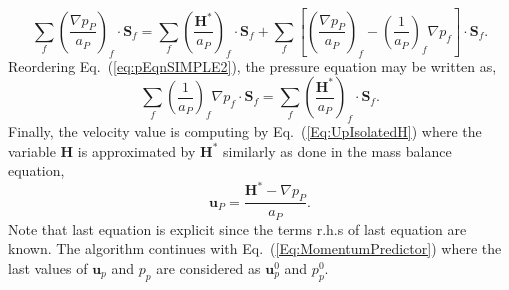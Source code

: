 \documentclass[final,3p,times,11pt,onecolumn]{myElsarticle}
\numberwithin{equation}{section}
\begin{document}
\begin{equation}
\label{eq:pEqnSIMPLE2}
\sum_{f} 
\left(
\dfrac
{
\nabla p_P}
{a_P}
\right)_f
\cdotp 
\textbf{S}_{f} 
=
\sum_f 
\left(
\dfrac{
\boldsymbol{H}^*
}
{
a_P
}
\right)_f
\cdot
\boldsymbol{S}_f 
+
\sum_f  
\left[
\left(
\frac{\nabla p_P}{a_P}
\right)_f
- 
\left(
\frac{1}{a_P}
\right)_f 
\nabla p_f
\right]
\cdot 
\boldsymbol{S}_f.
\end{equation}
Reordering Eq.~(\ref{eq:pEqnSIMPLE2}), the pressure equation may be written as,
\begin{equation}\label{eq:pEqnSIMPLE3}
\sum_f \left(\frac{1}{a_P}\right)_f \nabla p_f 
\cdot
\boldsymbol{S}_f 
=  \sum_f \left(\frac{\boldsymbol{H}^*}{a_P}\right)_f \cdot \boldsymbol{S}_f.
\end{equation}
Finally, the velocity value is computing by Eq.~(\ref{Eq:UpIsolatedH}) where the variable $\boldsymbol{H}$ is approximated by $\boldsymbol{H}^{*}$ similarly as done in the mass balance equation,
\begin{equation}
\label{eq:SIMPLECorr}
\boldsymbol{u}_P
=
\dfrac
{
\boldsymbol{H}^*
- 
\nabla p_P}
{a_P}.
\end{equation}
Note that last equation is explicit since the terms r.h.s of last equation are known. The algorithm continues with Eq.~(\ref{Eq:MomentumPredictor}) where the last values of $\boldsymbol{u}_p$ and $p_p$ are considered as $\boldsymbol{u}_p^0$ and $p_p^0$.



%
%
%
%
%
\end{document}

